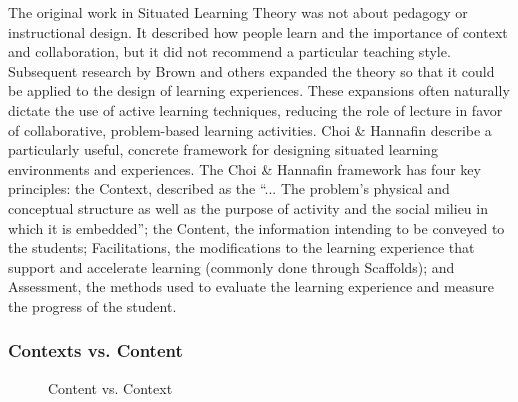 The original work in Situated Learning Theory was not about pedagogy or instructional design. It described how people learn and the importance of context and collaboration, but it did not recommend a particular teaching style.
Subsequent research by Brown \cite{brown1989situated} and others expanded the theory so that it could be applied to the design of learning experiences.
These expansions often naturally dictate the use of active learning techniques, reducing the role of lecture in favor of collaborative, problem-based learning activities.
Choi \& Hannafin \cite{situated-cognition} describe a particularly useful, concrete framework for designing situated learning environments and experiences.
The Choi \& Hannafin framework has four key principles: the Context, described as the ``... The problem's physical and conceptual structure as well as the purpose of activity and the social milieu in which it is embedded''\cite{rogoff1984everyday}; the Content, the information intending to be conveyed to the students; Facilitations, the modifications to the learning experience that support and accelerate learning (commonly done through Scaffolds); and Assessment, the methods used to evaluate the learning experience and measure the progress of the student.
	
\subsubsection{Contexts vs. Content}

\begin{wrapfigure}{R}{0.5\textwidth}
		\begin{center}
		\end{center}
		\caption{Content vs. Context}
		\label{fig-content-context}
\end{wrapfigure}

